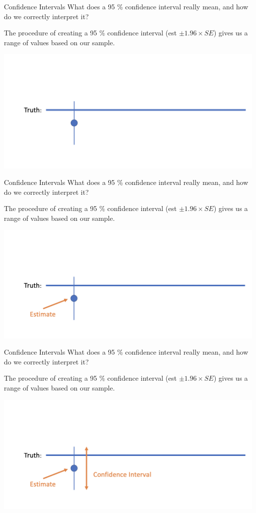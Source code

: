 \documentclass[
  ignorenonframetext,
]{beamer}
\begin{document}
\begin{frame}{Confidence Intervals}
\protect\hypertarget{confidence-intervals}{}
What does a 95 \% confidence interval really mean, and how do we
correctly interpret it?

The procedure of creating a 95 \% confidence interval (est
\(\pm 1.96 \times SE\)) gives us a range of values based on our sample.

\includegraphics{ci1.png}
\end{frame}

\begin{frame}{Confidence Intervals}
\protect\hypertarget{confidence-intervals-1}{}
What does a 95 \% confidence interval really mean, and how do we
correctly interpret it?

The procedure of creating a 95 \% confidence interval (est
\(\pm 1.96 \times SE\)) gives us a range of values based on our sample.

\includegraphics{ci2.png}
\end{frame}

\begin{frame}{Confidence Intervals}
\protect\hypertarget{confidence-intervals-2}{}
What does a 95 \% confidence interval really mean, and how do we
correctly interpret it?

The procedure of creating a 95 \% confidence interval (est
\(\pm 1.96 \times SE\)) gives us a range of values based on our sample.

\includegraphics{ci3.png}
\end{frame}
\end{document}

